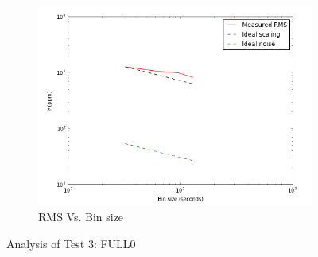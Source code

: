 \documentclass{aastex6}
\begin{document}
\begin{figure}[H]
    \begin{subfigure}{3}
        \includegraphics[scale=0.6]{rms_test3}
        \caption{RMS Vs. Bin size}
    \end{subfigure}
    \caption{Analysis of Test 3: FULL0}
\end{figure}
\end{document}
